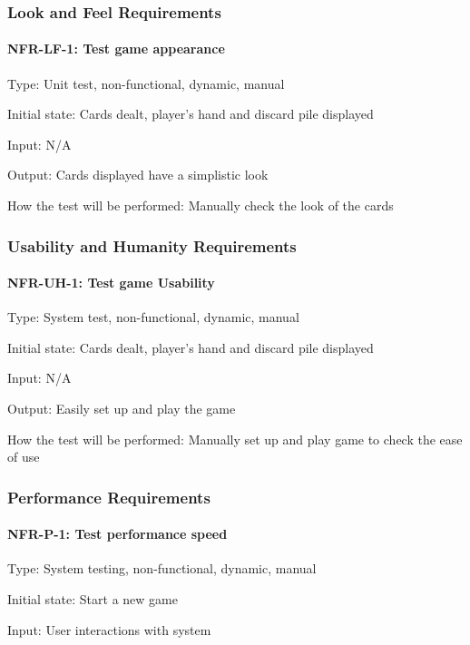 \documentclass[12pt, titlepage]{article}
\begin{document}
\subsubsection{Look and Feel Requirements}

\paragraph{NFR-LF-1: Test game appearance\\}
Type: Unit test, non-functional, dynamic, manual

Initial state: Cards dealt, player's hand and discard pile displayed

Input: N/A

Output: Cards displayed have a simplistic look

How the test will be performed: Manually check the look of the cards

\subsubsection{Usability and Humanity Requirements}

\paragraph{NFR-UH-1: Test game Usability\\}
Type: System test, non-functional, dynamic, manual

Initial state: Cards dealt, player's hand and discard pile displayed

Input: N/A

Output: Easily set up and play the game

How the test will be performed: Manually set up and play game to check the ease of use

\subsubsection{Performance Requirements}

\paragraph{NFR-P-1: Test performance speed\\}

Type: System testing, non-functional, dynamic, manual

Initial state: Start a new game 

Input: User interactions with system
\end{document}
